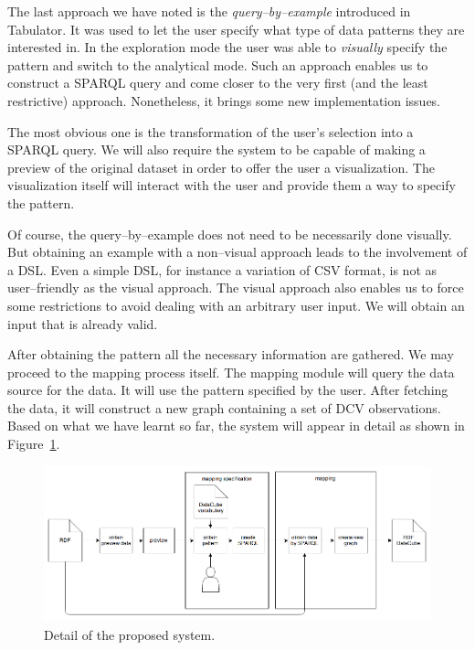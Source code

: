 The last approach we have noted is the \emph{query--by--example} introduced in 
Tabulator. It was used to let the user specify what type of data patterns they are 
interested in. In the exploration mode the user was able to \emph{visually} 
specify the pattern and switch to the analytical mode. Such an approach enables 
us to construct a SPARQL query and come closer to the very first (and the least restrictive) 
approach. Nonetheless, it brings some new implementation issues.

The most obvious one is the transformation of the user's selection into a SPARQL query. 
We will also require the system to be capable of making a preview of the 
original dataset in order to offer the user a visualization. The visualization 
itself will interact with the user and provide them a way to specify the pattern.

Of course, the query--by--example does not need to be necessarily done visually. But 
obtaining an example with a non--visual approach leads to the involvement of a DSL. Even 
a simple DSL, for instance a variation of CSV format, is not as user--friendly as 
the visual approach. The visual approach also enables us to force some 
restrictions to avoid dealing with an arbitrary user input. We will 
obtain an input that is already valid.

After obtaining the pattern all the necessary information are gathered. We 
may proceed to the mapping process itself. The mapping module will query the 
data source for the data. It will use the pattern specified by the user. After 
fetching the data, it will construct a new graph containing a set of DCV 
observations. Based on what we have learnt so far, the system will appear in detail 
as shown in Figure~\ref{fig:generic-mapping-detail}.

\begin{figure}
	\centering
	\includegraphics[width=140mm]{img/generic-mapping-detail.png}
	\caption{Detail of the proposed system.}
	\label{fig:generic-mapping-detail}
\end{figure}


